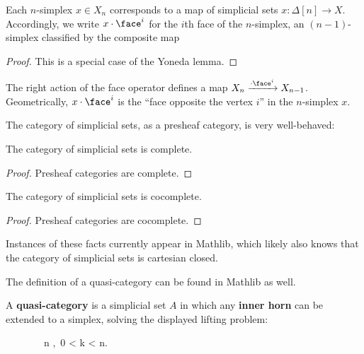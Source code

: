 \begin{lemma}\label{lem:simplex-yoneda}
  \leanok
  Each $n$-simplex $x \in X_n$ corresponds to a map of simplicial sets $x \colon \Delta[n] \to X$. Accordingly, we write $x \cdot \face^i$ for the $i$th face of the $n$-simplex, an $(n-1)$-simplex classified by the composite map
\begin{center}
\end{center}
\end{lemma}
\begin{proof}
  \leanok
  This is a special case of the Yoneda lemma.
\end{proof}

The right action of the face operator defines a map $X_n \xrightarrow{\cdot\face^i} X_{n-1}$. Geometrically, $x\cdot \face^i$ is the ``face opposite the vertex $i$'' in the $n$-simplex $x$.

The category of simplicial sets, as a presheaf category, is very well-behaved:

\begin{corollary}\label{cor:sset-cat-limits}
\leanok
{}
  The category of simplicial sets is complete.
\end{corollary}
\begin{proof}
  \leanok
Presheaf categories are complete.
\end{proof}

\begin{corollary}\label{cor:sset-cat-colimits}
  \leanok
    The category of simplicial sets is cocomplete.
\end{corollary}
\begin{proof}
  \leanok
Presheaf categories are cocomplete.
\end{proof}


Instances of these facts currently appear in Mathlib, which likely also knows that the category of simplicial sets is cartesian closed.

The definition of a quasi-category can be found in Mathlib as well.

\begin{definition}\label{defn:quasi-category}
\leanok
{}
   A \textbf{quasi-category} is a simplicial set $A$ in which any \textbf{inner horn} can be extended to a simplex, solving the displayed lifting problem:
  \begin{figure}\label{eq:qcat-defn}
   \qquad  {}\ \ n ,\ 0 < k < n.
\end{figure}
\end{definition}

